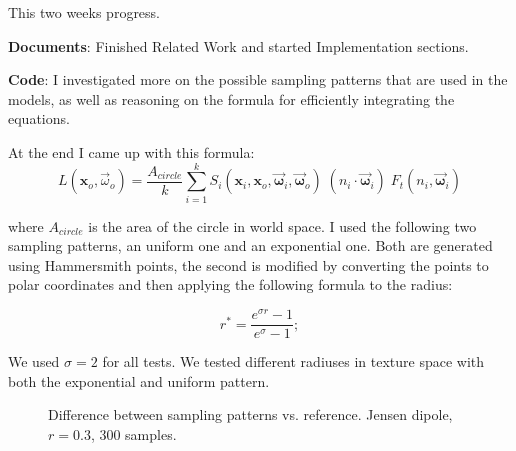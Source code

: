 \documentclass[12pt, twoside,a4paper]{article}
\begin{document}
This two weeks progress. 

\textbf{Documents}: Finished Related Work and started Implementation sections.

\textbf{Code}: I investigated more on the possible sampling patterns that are used in the models, as well as reasoning on the formula for efficiently integrating the equations.

At the end I came up with this formula:
$$
L(\mathbf{x}_o, \vec{\omega}_o) = \frac{A_{circle}}{k}\sum_{i = 1}^{k}S_i(\mathbf{x}_i,\mathbf{x}_o,\vec{\mathbf{\omega}}_i, \vec{\mathbf{\omega}}_o) \; (n_i\cdot \vec{\mathbf{\omega}}_i) \; F_t(n_i,\vec{\mathbf{\omega}}_i)
$$

where $A_{circle}$ is the area of the circle in world space. I used the following two sampling patterns, an uniform one and an exponential one. Both are generated using Hammersmith points, the second is modified by converting the points to polar coordinates and then applying the following formula to the radius:

$$
r^{*} =  \frac{e^{\sigma r} - 1}{e^{\sigma} - 1}; 
$$

We used $\sigma = 2$ for all tests. We tested different radiuses in texture space with both the exponential and uniform pattern.

\clearpage
\begin{figure}[!ht]
\centering
{} 
 
\caption{Difference between sampling patterns vs. reference. Jensen dipole, $r = 0.3$, 300 samples.}
\label{fig:img}
\end{figure}
\end{document}
